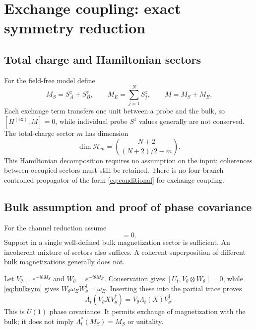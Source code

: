 \documentclass[11pt,a4paper]{article}
\newcommand{\HH}{\mathcal H}
\newcommand{\ex}{\mathrm{ex}}
\begin{document}
\section{Exchange coupling: exact symmetry reduction}
\label{sec:ex}

\subsection{Total charge and Hamiltonian sectors}

For the field-free model define
\begin{equation}
 M_S=S_A^z+S_B^z,\qquad M_E=\sum_{j=1}^N S_j^z,
 \qquad M=M_S+M_E.
\end{equation}
Each exchange term transfers one unit between a probe and the bulk,
so $[H^{(\ex)},M]=0$, while individual probe $S^z$ values generally
are not conserved. The total-charge sector $m$ has dimension
\begin{equation}
 \dim\HH_m=\binom{N+2}{(N+2)/2-m}.
\end{equation}
This Hamiltonian decomposition requires no assumption on the input;
coherences between occupied sectors must still be retained.
There is no four-branch controlled propagator of the form
\eqref{eq:conditional} for exchange coupling.

\subsection{Bulk assumption and proof of phase covariance}

For the channel reduction assume
\begin{equation}
 [\omega_E,M_E]=0.
 \label{eq:bulksym}
\end{equation}
Support in a single well-defined bulk magnetization sector is sufficient.
An incoherent mixture of sectors also suffices. A coherent superposition
of different bulk magnetizations generally does not.

Let $V_\theta=e^{-i\theta M_S}$ and $W_\theta=e^{-i\theta M_E}$.
Conservation gives $[U_t,V_\theta\otimes W_\theta]=0$, while
\eqref{eq:bulksym} gives $W_\theta\omega_EW_\theta^\dagger=\omega_E$.
Inserting these into the partial trace proves
\begin{equation}
 \boxed{\Lambda_t(V_\theta XV_\theta^\dagger)
       =V_\theta\Lambda_t(X)V_\theta^\dagger.}
 \label{eq:covariance}
\end{equation}
This is $U(1)$ phase covariance. It permits exchange of magnetization
with the bulk; it does not imply $\Lambda_t^*(M_S)=M_S$ or unitality.
\end{document}
